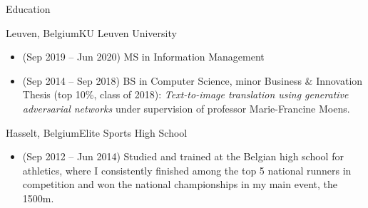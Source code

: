 \documentclass[]{mcdowellcv}
\begin{document}
\begin{cvsection}{Education}
	\begin{cvsubsection}{Leuven, Belgium}{KU Leuven University}{}
		\begin{itemize}
			\item (Sep 2019 -- Jun 2020) MS in Information Management
			\item (Sep 2014 -- Sep 2018) BS in Computer Science, minor Business \& Innovation
			\\ Thesis (top 10\%, class of 2018): \emph{Text-to-image translation using generative adversarial networks} under supervision of professor Marie-Francine Moens.
		\end{itemize}
	\end{cvsubsection}
	\begin{cvsubsection}{Hasselt, Belgium}{Elite Sports High School}{}
		\begin{itemize}
			\item (Sep 2012 -- Jun 2014) Studied and trained at the Belgian high school for athletics, where I consistently finished among the top 5 national runners in competition and won the national championships in my main event, the 1500m.
		\end{itemize}
	\end{cvsubsection}
\end{cvsection}
\end{document}

